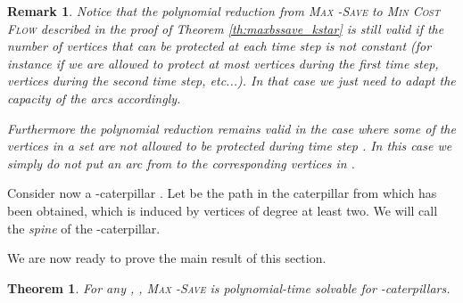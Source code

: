 \documentclass[10pt]{article}
\newcommand{\probtitle}[1]{\textsc{#1}}
\newtheorem{remark}{Remark}
\newtheorem{theorem}{Theorem}
\begin{document}
\begin{remark}
\label{kstar_general}
Notice that the polynomial reduction from \probtitle{Max -Save} to \probtitle{Min Cost Flow} described in the proof of Theorem \ref{th:maxbssave_kstar} is still valid if the number of vertices that can be protected at each time step is not constant (for instance if we are allowed to protect at most  vertices during the first time step,  vertices during the second time step, etc...). In that case we just need to adapt the capacity of the arcs  accordingly.

Furthermore the polynomial reduction remains valid in the case where some of the vertices in a set  are not allowed to be protected during time step . In this case we simply do not put an arc from  to the corresponding vertices  in .
\end{remark}

Consider now a -caterpillar . Let  be the path in the caterpillar from which  has been obtained, which is induced by vertices of degree at least two. We will call  the \textit{spine} of the -caterpillar.

We are now ready to prove the main result of this section.

\begin{theorem}
\label{th:maxbssave_kcater}
For any , , \probtitle{Max -Save} is polynomial-time solvable for -caterpillars.
\end{theorem}
\end{document}
